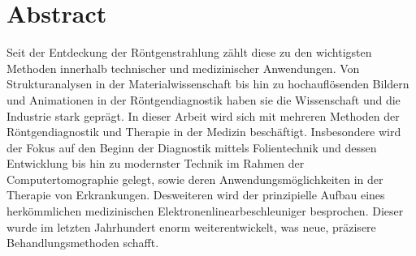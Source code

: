 \section{Abstract}

Seit der Entdeckung der Röntgenstrahlung zählt diese zu den wichtigsten Methoden innerhalb technischer und medizinischer Anwendungen.
Von Strukturanalysen in der Materialwissenschaft bis hin zu hochauflösenden Bildern und Animationen in der Röntgendiagnostik haben 
sie die Wissenschaft und die Industrie stark geprägt. In dieser Arbeit wird sich mit mehreren Methoden der Röntgendiagnostik und 
Therapie in der Medizin beschäftigt. Insbesondere wird der Fokus auf den Beginn der 
Diagnostik mittels Folientechnik und dessen Entwicklung bis hin zu modernster Technik im Rahmen der Computertomographie gelegt, sowie
deren Anwendungsmöglichkeiten in der Therapie von Erkrankungen. Desweiteren wird der prinzipielle Aufbau eines herkömmlichen medizinischen Elektronenlinearbeschleuniger besprochen.
Dieser wurde im letzten Jahrhundert enorm weiterentwickelt, was neue, präzisere Behandlungsmethoden schafft.